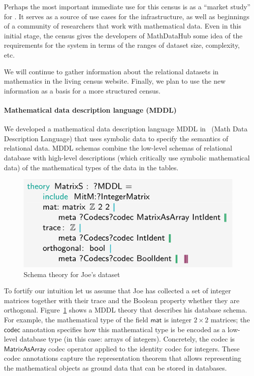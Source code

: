 Perhaps the most important immediate use for this census is as a 
``market study'' for \dmh.
It serves as a source of use cases for the infrastructure,
as well as beginnings of a community of researchers that work with mathematical data.
Even in this initial stage, the census gives the developers of MathDataHub
some idea of the requirements for the system in terms of the ranges of
dataset size, complexity, etc.

We will continue to gather information about the relational datasets 
in mathematics in the living census website.
Finally, we plan to use the new information as a basis for a more structured census.

\paragraph{Mathematical data description language (MDDL)}
We developed a mathematical data description language MDDL in~\cite{BerKohRab:tumdi19} (Math Data Description Language) that uses symbolic data to specify the semantics of relational data.
MDDL schemas combine the low-level schemas of relational database with high-level descriptions (which critically use symbolic mathematical data) of the mathematical types of the data in the tables.

\begin{figure}[ht]
  \includegraphics[width=.48\textwidth]{data_joe-schema}
  \caption{Schema theory for Joe's dataset}\label{fig:joe-schema}
\end{figure}

To fortify our intuition let us assume that Joe has collected a set of integer matrices together with their trace
and the Boolean property whether they are orthogonal.
Figure~\ref{fig:joe-schema} shows a MDDL theory that describes his database schema.
For example, the mathematical type of the field $\mathsf{mat}$ is integer $2\times2$ matrices;
the $\mathsf{codec}$ annotation specifies how this mathematical type is be encoded as a low-level database type (in this case: arrays of integers).
Concretely, the codec is $\mathsf{MatrixAsArray}$ codec operator applied to the identity codec for integers.
These codec annotations capture the representation theorem that allows representing the mathematical objects as ground data that can be stored in databases. 

